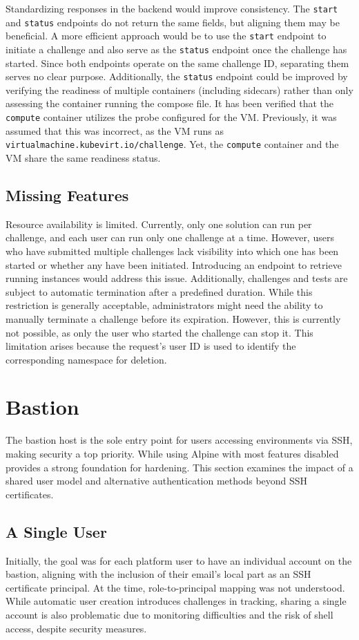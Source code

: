 Standardizing responses in the backend would improve consistency. The \texttt{start} and \texttt{status} endpoints do not return the same fields, but aligning them may be beneficial. A more efficient approach would be to use the \texttt{start} endpoint to initiate a challenge and also serve as the \texttt{status} endpoint once the challenge has started. Since both endpoints operate on the same challenge ID, separating them serves no clear purpose. Additionally, the \texttt{status} endpoint could be improved by verifying the readiness of multiple containers (including sidecars) rather than only assessing the container running the compose file. It has been verified that the \texttt{compute} container utilizes the probe configured for the VM. Previously, it was assumed that this was incorrect, as the VM runs as \texttt{virtualmachine.kubevirt.io/challenge}. Yet, the \texttt{compute} container and the VM share the same readiness status.

\subsection{Missing Features}
Resource availability is limited. Currently, only one solution can run per challenge, and each user can run only one challenge at a time. However, users who have submitted multiple challenges lack visibility into which one has been started or whether any have been initiated. Introducing an endpoint to retrieve running instances would address this issue. Additionally, challenges and tests are subject to automatic termination after a predefined duration. While this restriction is generally acceptable, administrators might need the ability to manually terminate a challenge before its expiration. However, this is currently not possible, as only the user who started the challenge can stop it. This limitation arises because the request's user ID is used to identify the corresponding namespace for deletion.

\section{Bastion}
The bastion host is the sole entry point for users accessing environments via SSH, making security a top priority. While using Alpine with most features disabled provides a strong foundation for hardening. This section examines the impact of a shared user model and alternative authentication methods beyond SSH certificates.

\subsection{A Single User}
Initially, the goal was for each platform user to have an individual account on the bastion, aligning with the inclusion of their email's local part as an SSH certificate principal. At the time, role-to-principal mapping was not understood. While automatic user creation introduces challenges in tracking, sharing a single account is also problematic due to monitoring difficulties and the risk of shell access, despite security measures.

